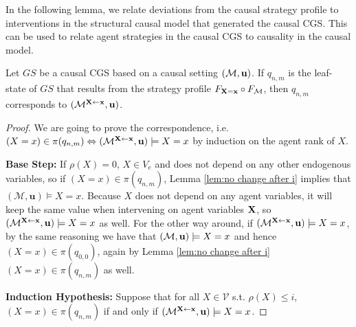 In the following lemma, we relate deviations from the causal strategy profile to interventions in the structural causal model that generated the causal CGS. This can be used to relate agent strategies in the causal CGS to causality in the causal model.
\begin{lemma}\label{lem:causal strat leads to causal setting}
    Let $GS$ be a causal CGS based on a causal setting $(\mathcal{M},\mathbf{u})$. If $q_{n,m}$ is the leaf-state of $GS$ that results from the strategy profile $F_{\mathbf{X} = \mathbf{x}} \circ F_\mathcal{M}$, then $q_{n,m}$ corresponds to $(\mathcal{M}^{\mathbf{X} \leftarrow \mathbf{x}},\mathbf{u})$.
\end{lemma}
\begin{proof}
    We are going to prove the correspondence, i.e. $(X = x) \in \pi(q_{n,m}) \Leftrightarrow (\mathcal{M}^{\mathbf{X} \leftarrow \mathbf{x}}, \mathbf{u}) \models X = x$ by induction on the agent rank of $X$.
    
    \noindent \textbf{Base Step:} If $\rho(X) = 0$, $X \in V_e$ and does not depend on any other endogenous variables, so if $(X = x)\in \pi(q_{n,m})$, Lemma \ref{lem:no change after i} 
    implies that $(\mathcal{M}, \mathbf{u}) \models X = x$. Because $X$ does not depend on any agent variables, it will keep the same value when intervening on agent variables $\mathbf{X}$, so $(\mathcal{M}^{\mathbf{X}\leftarrow\mathbf{x}},\mathbf{u}) \models X = x$ as well. For the other way around, if $(\mathcal{M}^{\mathbf{X}\leftarrow\mathbf{x}},\mathbf{u})\models X = x$, by the same reasoning we have that $(\mathcal{M},\mathbf{u}) \models X = x$ and hence $(X = x) \in \pi(q_{0,0})$, again by Lemma \ref{lem:no change after i} 
    $(X = x) \in \pi(q_{n,m})$ as well.

    \noindent\textbf{Induction Hypothesis:} Suppose that for all $X \in \mathcal{V}$ s.t. $\rho(X) \leq i$, $(X = x) \in \pi(q_{n,m})$ if and only if $(\mathcal{M}^{\mathbf{X} \leftarrow \mathbf{x}},\mathbf{u}) \models X = x$.


\end{proof}
